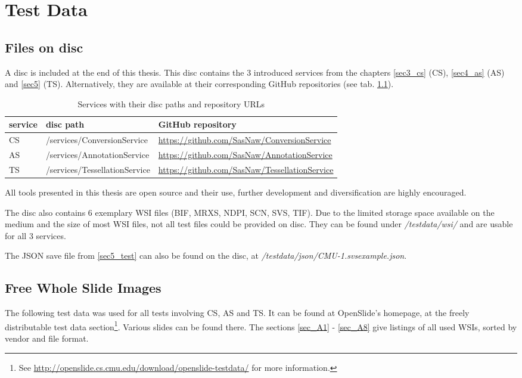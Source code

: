 \chapter{Test Data}

\section{Files on disc}
\label{secA_cd}

A disc is included at the end of this thesis. This disc contains the 3 introduced services from the chapters \ref{sec3_cs} (CS), \ref{sec4_as} (AS) and \ref{sec5} (TS). Alternatively, they are available at their corresponding GitHub repositories (see tab. \ref{tabA_paths}).

\begin{table}[H]
	\begin{center}
		\begin{tabular}{| p{1.5cm} | p{4.5cm} | p{5cm} |}
			\hline
			\textbf{service} & \textbf{disc path} & \textbf{GitHub repository} \\ \hline
			CS & /services/ConversionService & \url{https://github.com/SasNaw/ConversionService} \\ \hline
			AS & /services/AnnotationService & \url{https://github.com/SasNaw/AnnotationService} \\ \hline
			TS & /services/TessellationService & \url{https://github.com/SasNaw/TessellationService}  \\ \hline
		\end{tabular}
		\caption{Services with their disc paths and repository URLs}
		\label{tabA_paths}
	\end{center}
\end{table}

All tools presented in this thesis are open source and their use, further development and diversification are highly encouraged.

The disc also contains 6 exemplary WSI files (BIF, MRXS, NDPI, SCN, SVS, TIF). Due to the limited storage space available on the medium and the size of most WSI files, not all test files could be provided on disc. They can be found under \emph{/testdata/wsi/} and are usable for all 3 services.

The JSON save file from \ref{sec5_test} can also be found on the disc, at \emph{/testdata/{\allowbreak}json/CMU-1.svs{\textunderscore}example.json}.



\section{Free Whole Slide Images}
\label{secA}
The following test data was used for all tests involving CS, AS and TS. It can be found at OpenSlide's homepage, at the freely distributable test data section\footnote{
	See \url{http://openslide.cs.cmu.edu/download/openslide-testdata/} for more information.
}. Various slides can be found there. The sections \ref{sec_A1} - \ref{sec_A8} give listings of all used WSIs, sorted by vendor and file format.

